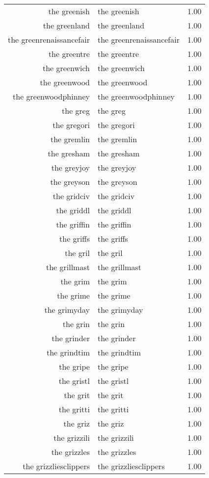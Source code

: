 \begin{table}[ht]
\begin{tabular}{rlr}
  the greenish & the greenish & 1.00 \\ 
  the greenland & the greenland & 1.00 \\ 
  the greenrenaissancefair & the greenrenaissancefair & 1.00 \\ 
  the greentre & the greentre & 1.00 \\ 
  the greenwich & the greenwich & 1.00 \\ 
  the greenwood & the greenwood & 1.00 \\ 
  the greenwoodphinney & the greenwoodphinney & 1.00 \\ 
  the greg & the greg & 1.00 \\ 
  the gregori & the gregori & 1.00 \\ 
  the gremlin & the gremlin & 1.00 \\ 
  the gresham & the gresham & 1.00 \\ 
  the greyjoy & the greyjoy & 1.00 \\ 
  the greyson & the greyson & 1.00 \\ 
  the gridciv & the gridciv & 1.00 \\ 
  the griddl & the griddl & 1.00 \\ 
  the griffin & the griffin & 1.00 \\ 
  the griffs & the griffs & 1.00 \\ 
  the gril & the gril & 1.00 \\ 
  the grillmast & the grillmast & 1.00 \\ 
  the grim & the grim & 1.00 \\ 
  the grime & the grime & 1.00 \\ 
  the grimyday & the grimyday & 1.00 \\ 
  the grin & the grin & 1.00 \\ 
  the grinder & the grinder & 1.00 \\ 
  the grindtim & the grindtim & 1.00 \\ 
  the gripe & the gripe & 1.00 \\ 
  the gristl & the gristl & 1.00 \\ 
  the grit & the grit & 1.00 \\ 
  the gritti & the gritti & 1.00 \\ 
  the griz & the griz & 1.00 \\ 
  the grizzili & the grizzili & 1.00 \\ 
  the grizzles & the grizzles & 1.00 \\ 
  the grizzliesclippers & the grizzliesclippers & 1.00 \\ 

\end{tabular}
\end{table}
